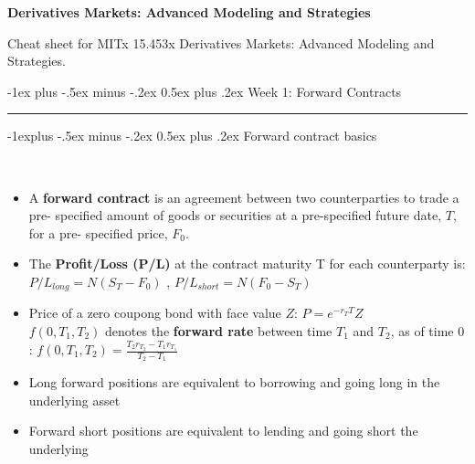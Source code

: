 \documentclass[10pt,landscape,a4paper]{article}
\makeatletter
\renewcommand{\section}{\@startsection{section}{1}{0mm}%
                                {-1ex plus -.5ex minus -.2ex}%
                                {0.5ex plus .2ex}%
                                {\normalfont\large\bfseries}}
\renewcommand{\subsection}{\@startsection{subsection}{2}{0mm}%
                                {-1explus -.5ex minus -.2ex}%
                                {0.5ex plus .2ex}%
                                {\normalfont\normalsize\bfseries}}
\makeatother
\begin{document}
\raggedright
\footnotesize
\begin{multicols*}{3}

\setlength{\premulticols}{1pt}
\setlength{\postmulticols}{1pt}
\setlength{\multicolsep}{1pt}
\setlength{\columnsep}{1pt}


\begin{center}
    {\color{blue} \Large{\textbf{Derivatives Markets: Advanced Modeling and Strategies}}} 
\end{center}


\scriptsize

Cheat sheet for MITx 15.453x Derivatives Markets: Advanced Modeling and Strategies.



\section{Week 1: Forward Contracts}\smallskip \hrule height 1pt \smallskip

\subsection{Forward contract basics}

\begin{description}[topsep=0pt]
	\item[Forward Contract] ~
	\begin{itemize}[topsep=0pt]
		\item A \textbf{forward contract} is an agreement between two counterparties to trade a pre-
		specified amount of goods or securities at a pre-specified future date, $T$, for a pre-
		specified price, $F_0$.
		\item The \textbf{Profit/Loss (P/L)} at the contract maturity T for each counterparty is:
		$P/L_{long} = N (S_T - F_0)$  , $P/L_{short} = N (F_0- S_T)$    
		\item  Price of a zero coupong bond with face value $Z$:  $P=e^{-r_T T}Z $\\
		$f(0,T_1,T_2)$ 	denotes the \textbf{forward rate} between time $T_1$ and $T_2$, as of
		time 0 : $f(0,T_1,T_2) = \frac{T_2 r_{T_2} - T_1 r_{T_1}}{T_2-T_1}$  
		\item Long forward positions are equivalent to borrowing and going long
		in the underlying asset
		\item Forward short positions are equivalent to lending and going short
		the underlying		
	\end{itemize}
\end{description}
 

\end{multicols*}
\end{document}
